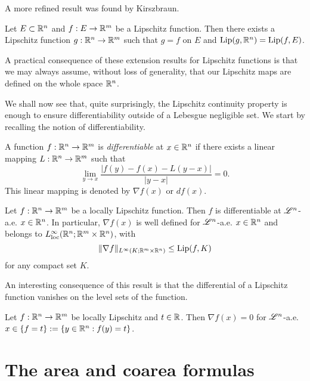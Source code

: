 A more refined result was found by Kirszbraun.

\begin{theorem}
Let $E \subset \mathbb{R}^{n}$ and $f: E \to \mathbb{R}^{m}$ be a Lipschitz function. Then there exists a Lipschitz function $g: \mathbb{R}^{n} \to \mathbb{R}^{m}$ such that $g = f$ on $E$ and $\operatorname{Lip}(g, \mathbb{R}^{n}) = \operatorname{Lip}(f, E)$.
\end{theorem}

A practical consequence of these extension results for Lipschitz functions is that we may always assume, without loss of generality, that our Lipschitz maps are defined on the whole space $\mathbb{R}^{n}$.

We shall now see that, quite surprisingly, the Lipschitz continuity property is enough to ensure differentiability outside of a Lebesgue negligible set. We start by recalling the notion of differentiability.

\begin{definition}
A function $f : \mathbb{R}^{n} \to \mathbb{R}^{m}$ is {\em differentiable} at $x \in \mathbb{R}^{n}$ if there exists a linear mapping $L: \mathbb{R}^{n} \to \mathbb{R}^{m}$ such that
\begin{equation*}
\lim_{y \to x} \frac{|f(y) - f(x) - L(y - x)|}{|y - x|} = 0.
\end{equation*}
This linear mapping is denoted by $\nabla f(x)$ or $d f(x)$.
\end{definition}

\begin{theorem}
Let $f : \mathbb{R}^{n} \to \mathbb{R}^{m}$ be a locally Lipschitz function. Then $f$ is differentiable at $\mathscr{L}^{n}$-a.e. $x \in \mathbb{R}^{n}$. In particular, $\nabla f(x)$ is well defined for $\mathscr{L}^{n}$-a.e. $x \in \mathbb{R}^{n}$ and belongs to $L^{\infty}_{\rm loc}(\mathbb{R}^{n}; \mathbb{R}^{m} \times \mathbb{R}^{n})$, with $$\|\nabla f\|_{L^{\infty}(K; \mathbb{R}^{m} \times \mathbb{R}^{n})} \le \operatorname{Lip}(f, K)$$ for any compact set $K$.
\end{theorem}

An interesting consequence of this result is that the differential of a Lipschitz function vanishes on the level sets of the function.

\begin{theorem}
Let $f: \mathbb{R}^{n} \to \mathbb{R}^{m}$ be locally Lipschitz and $t \in \mathbb{R}$. Then $\nabla f(x) = 0$ for $\mathscr{L}^{n}$-a.e. $x \in \{ f = t\} := \{ y \in \mathbb{R}^{n}: f(y) = t\}$.
\end{theorem}

\section{The area and coarea formulas}


